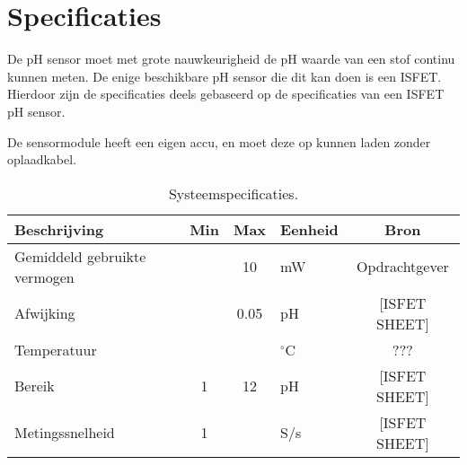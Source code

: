 \section{Specificaties}
De pH sensor moet met grote nauwkeurigheid de pH waarde van een stof continu kunnen meten. 
De enige beschikbare pH sensor die dit kan doen is een ISFET.
Hierdoor zijn de specificaties deels gebaseerd op de specificaties van een ISFET pH sensor.

De sensormodule heeft een eigen accu, en moet deze op kunnen laden zonder oplaadkabel.

\begin{table}[ht]
    \centering
    \begin{tabular}{|l|c c|l|c|}
        \hline
        Beschrijving                 & Min & Max  & Eenheid   & Bron \\
        \hline 
        Gemiddeld gebruikte vermogen &     & 10   & mW        & Opdrachtgever \\
        Afwijking                    &     & 0.05 & pH        & [ISFET SHEET] \\ 
        Temperatuur                  &     &      & $^\circ$C & ???           \\
        Bereik                       & 1   & 12   & pH        & [ISFET SHEET] \\
        Metingssnelheid              & 1   &      & S/s       & [ISFET SHEET] \\
        \hline
    \end{tabular}
    \caption{Systeemspecificaties.}
    \label{tab:systemSpecs}
\end{table}




